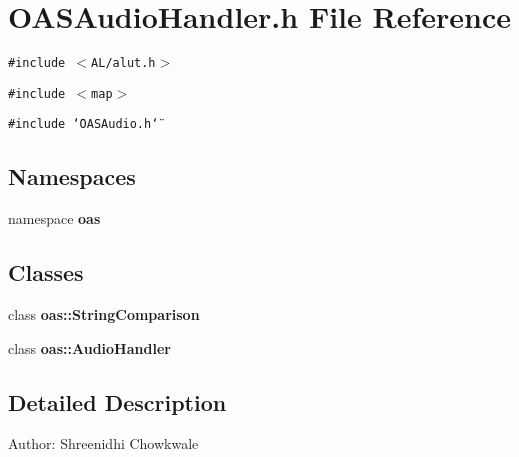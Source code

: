 \section{OASAudio\-Handler.h File Reference}
\label{OASAudioHandler_8h}
{\tt \#include $<$AL/alut.h$>$}\par
{\tt \#include $<$map$>$}\par
{\tt \#include \char`\"{}OASAudio.h\char`\"{}}\par
\subsection*{Namespaces}
\begin{CompactItemize}
\item 
namespace \textbf{oas}
\end{CompactItemize}
\subsection*{Classes}
\begin{CompactItemize}
\item 
class \textbf{oas::String\-Comparison}
\item 
class \textbf{oas::Audio\-Handler}
\end{CompactItemize}


\subsection{Detailed Description}
\begin{Desc}
\item[Author:]Shreenidhi Chowkwale \end{Desc}
